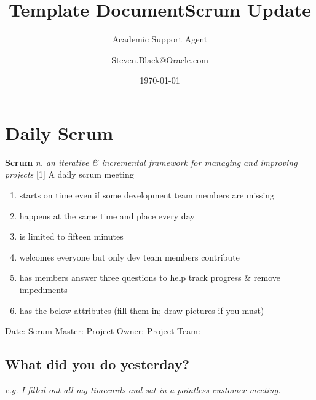 \documentclass{article}
\title{Template Document}
\author{Academic Support Agent}
\date{\today}
\begin{document}
\maketitle

\title{Scrum Update}
\author{Steven.Black@Oracle.com}
\maketitle

\section{Daily Scrum}
\textbf{Scrum} 
\textit{n. an iterative \& incremental framework for managing and improving projects} 
[1]
\newline 
\newline 
A daily scrum meeting
\begin{enumerate}[nosep, label=\textendash]
	\item starts on time even if some development team members are missing
    \item happens at the same time and place every day
    \item is limited to fifteen minutes 
    \item welcomes everyone but only dev team members contribute
    \item has members answer three questions to help track progress \& remove impediments
    \item has the below attributes (fill them in; draw pictures if you must)
\end{enumerate}
\hfill

\noindent
Date: \hspace{18mm} \underline{\hspace{3cm}}
\newline
Scrum Master: \hspace{3mm} \underline{\hspace{3cm}}
\newline
Project Owner: \hspace{2mm} \underline{\hspace{3cm}}
\newline
Project Team: \hspace{4mm} \underline{\hspace{3cm}}
\newline


\subsection{What did you do yesterday?}
\textit{e.g. I filled out all my timecards and sat in a pointless customer meeting.}
\newline 
\end{document}
